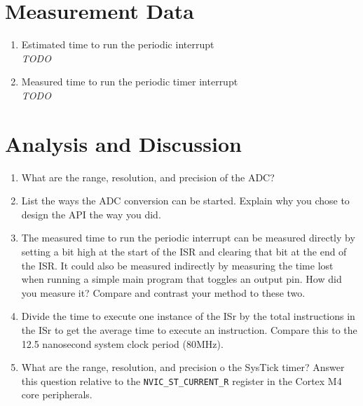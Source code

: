 \documentclass[12pt]{article}
\newcommand{\todo}{{\LARGE \emph{\color{red}TODO}}}
\begin{document}
\section{Measurement Data}
\begin{enumerate}[1)]
  \item Estimated time to run the periodic interrupt \\ \todo
  \item Measured time to run the periodic timer interrupt \\ \todo
  \end{enumerate}
\section{Analysis and Discussion}
\begin{enumerate}[1)]
  \item What are the range, resolution, and precision of the ADC?
  \item List the ways the ADC conversion can be started. Explain why
    you chose to design the API the way you did.
  \item The measured time to run the periodic interrupt can be
    measured directly by setting a bit high at the start of the ISR
    and clearing that bit at the end of the ISR. It could also be
    measured indirectly by measuring the time lost when running a
    simple main program that toggles an output pin. How did you measure
    it? Compare and contrast your method to these two.
  \item Divide the time to execute one instance of the ISr by the
    total instructions in the ISr to get the average time to execute
    an instruction. Compare this to the 12.5 nanosecond system clock
    period (80MHz).
  \item What are the range, resolution, and precision o the SysTick
    timer? Answer this question relative to the
    \verb|NVIC_ST_CURRENT_R| register in the Cortex M4 core peripherals.
\end{enumerate}
\end{document}
